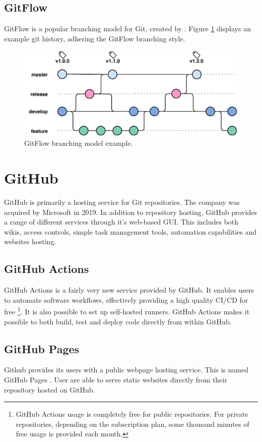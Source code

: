 \subsection{GitFlow}
GitFlow is a popular branching model for Git, created by \cite{gitflow}. Figure \ref{fig:gitflow} displays an example git history, adhering the GitFlow branching style.
\begin{figure}[h]
    \centering
    \includegraphics[page=1,width=\textwidth]{sections/methodology/figures/gitflow.pdf}
    \caption{GitFlow branching model example.}
    \label{fig:gitflow}
\end{figure}

\section{GitHub}
GitHub is primarily a hosting service for Git repositories. The company was acquired by Microsoft in 2019. In addition to repository hosting, GitHub provides a range of different services through it's web-based GUI. This includes both wikis, access controls, simple task management tools, automation capabilities and websites hosting.

\subsection{GitHub Actions}
GitHub Actions \cite{github-actions} is a fairly very new service provided by GitHub. It enables users to automate software workflows, effectively providing a high quality CI/CD for free \footnote{GitHub Actions usage is completely free for public repositories. For private repositories, depending on the subscription plan, some thousand minutes of free usage is provided each month.}. It is also possible to set up self-hosted runners. GitHub Actions makes it possible to both build, test and deploy code directly from within GitHub.

\subsection{GitHub Pages}
Github provides its users with a public webpage hosting service. This is named GitHub Pages \cite{github-pages}. User are able to serve static websites directly from their repository hosted on GitHub.


